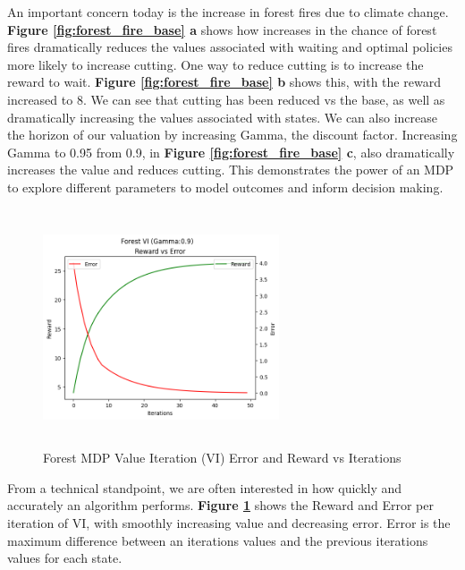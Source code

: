 \documentclass[letterpaper]{article} %
\begin{document}
An important concern today is the increase in forest fires due to climate change.  \textbf{Figure \ref{fig:forest_fire_base} a} shows how increases in the chance of forest fires dramatically reduces the values associated with waiting and optimal policies more likely to increase cutting.  One way to reduce cutting is to increase the reward to wait.   \textbf{Figure \ref{fig:forest_fire_base} b} shows this, with the reward increased to 8.  We can see that cutting has been reduced vs the base, as well as dramatically increasing the values associated with states.  We can also increase the horizon of our valuation by increasing Gamma, the discount factor.  Increasing Gamma to 0.95 from 0.9, in \textbf{Figure \ref{fig:forest_fire_base} c}, also dramatically increases the value and reduces cutting.  This demonstrates the power of an MDP to explore different parameters to model outcomes and inform decision making.


\begin{figure}[!htb]
\centering
\includegraphics[width=2.75in, height=2.75in]{Figures/Forest_VI_Gamma_0_9_Reward_vs_Error.png}
\caption{Forest MDP Value Iteration (VI) Error and Reward vs Iterations}
\label{fig:forest_vi_reward_error}
\end{figure}
From a technical standpoint, we are often interested in how quickly and accurately an algorithm performs. \textbf{Figure \ref{fig:forest_vi_reward_error}} shows the Reward and Error per iteration of VI, with smoothly increasing value and decreasing error.  Error is the maximum difference between an iterations values and the previous iterations values for each state.
\end{document}
